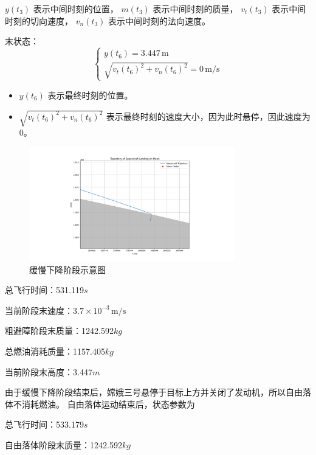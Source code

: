 \documentclass{ctexart}
\begin{document}

$y(t_3)$ 表示中间时刻的位置，
$m(t_3)$ 表示中间时刻的质量，
$v_t(t_3)$ 表示中间时刻的切向速度，
$v_n(t_3)$ 表示中间时刻的法向速度。

末状态：
\begin{equation}
\begin{cases}
y(t_6) = 3.447 \, \text{m} \\
\sqrt{v_t(t_6)^2 + v_n(t_6)^2} = 0 \, \text{m/s}
\end{cases}
\end{equation}

\begin{itemize}
\item $y(t_6)$ 表示最终时刻的位置。
\item $\sqrt{v_t(t_6)^2 + v_n(t_6)^2}$ 表示最终时刻的速度大小，因为此时悬停，因此速度为0。
\end{itemize}

    \begin{figure}[H] %
        \centering %
        \includegraphics[width=0.8\textwidth]{"./picture/stage5.png"} %
        \caption{缓慢下降阶段示意图} %
        \label{fig:example} %
    \end{figure}

总飞行时间：531.119\(s\)

当前阶段末速度：$3.7 \times 10^{-3} \, \text{m/s}$

粗避障阶段末质量：1242.592\(kg\)

总燃油消耗质量：1157.405\(kg\)

当前阶段末高度：3.447\(m\)

由于缓慢下降阶段结束后，嫦娥三号悬停于目标上方并关闭了发动机，所以自由落体不消耗燃油。
自由落体运动结束后，状态参数为

总飞行时间：533.179\(s\)

自由落体阶段末质量：1242.592\(kg\)
\end{document}
